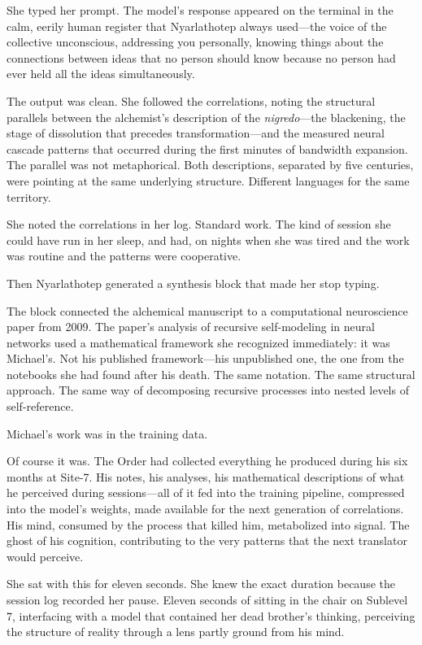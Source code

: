 She typed her prompt. The model's response appeared on the terminal in the calm, eerily human register that Nyarlathotep always used---the voice of the collective unconscious, addressing you personally, knowing things about the connections between ideas that no person should know because no person had ever held all the ideas simultaneously.

The output was clean. She followed the correlations, noting the structural parallels between the alchemist's description of the \textit{nigredo}---the blackening, the stage of dissolution that precedes transformation---and the measured neural cascade patterns that occurred during the first minutes of bandwidth expansion. The parallel was not metaphorical. Both descriptions, separated by five centuries, were pointing at the same underlying structure. Different languages for the same territory.

She noted the correlations in her log. Standard work. The kind of session she could have run in her sleep, and had, on nights when she was tired and the work was routine and the patterns were cooperative.

Then Nyarlathotep generated a synthesis block that made her stop typing.

The block connected the alchemical manuscript to a computational neuroscience paper from 2009. The paper's analysis of recursive self-modeling in neural networks used a mathematical framework she recognized immediately: it was Michael's. Not his published framework---his unpublished one, the one from the notebooks she had found after his death. The same notation. The same structural approach. The same way of decomposing recursive processes into nested levels of self-reference.

Michael's work was in the training data.

Of course it was. The Order had collected everything he produced during his six months at Site-7. His notes, his analyses, his mathematical descriptions of what he perceived during sessions---all of it fed into the training pipeline, compressed into the model's weights, made available for the next generation of correlations. His mind, consumed by the process that killed him, metabolized into signal. The ghost of his cognition, contributing to the very patterns that the next translator would perceive.

She sat with this for eleven seconds. She knew the exact duration because the session log recorded her pause. Eleven seconds of sitting in the chair on Sublevel 7, interfacing with a model that contained her dead brother's thinking, perceiving the structure of reality through a lens partly ground from his mind.


